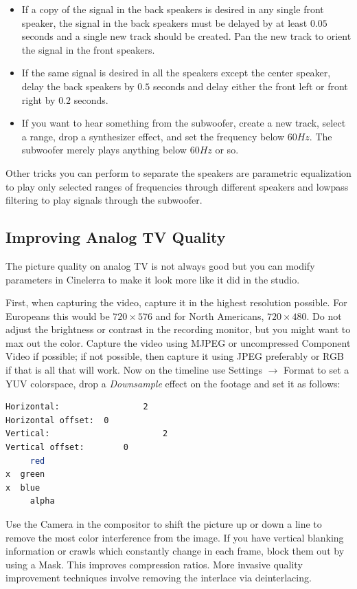 \begin{itemize}
	\item If a copy of the signal in the back speakers is desired in any single front speaker, the signal in the back
	speakers must be delayed by at least $0.05$ seconds and a single new track should be created. Pan the
	new track to orient the signal in the front speakers.
	\item If the same signal is desired in all the speakers except the center speaker, delay the back speakers by
	$0.5$ seconds and delay either the front left or front right by $0.2$ seconds.
	\item If you want to hear something from the subwoofer, create a new track, select a range, drop a
	synthesizer effect, and set the frequency below $60 Hz$. The subwoofer merely plays anything below
	$60Hz$ or so.
\end{itemize}

Other tricks you can perform to separate the speakers are parametric equalization to play only selected ranges of frequencies through different speakers and lowpass filtering to play signals through the subwoofer.

\subsection{Improving Analog TV Quality}%
\label{sub:improving_tv_quality}

The picture quality on analog TV is not always good but you can modify parameters in Cinelerra to make it look more like it did in the studio.

First, when capturing the video, capture it in the highest resolution possible. For Europeans this would be $720\times576$ and for North Americans, $720\times480$. Do not adjust the brightness or contrast in the recording monitor, but you might want to max out the color. Capture the video using MJPEG or uncompressed Component Video if possible; if not possible, then capture it using JPEG preferably or RGB if that is all that will work.  Now on the timeline use Settings $\rightarrow$ Format to set a YUV colorspace, drop a \textit{Downsample} effect on the footage and set it as follows:

\begin{lstlisting}[language=bash,numbers=none]
Horizontal:					2
Horizontal offset: 	0
Vertical:						2
Vertical offset: 		0
	 red
x  green
x  blue
	 alpha
\end{lstlisting}

Use the Camera in the compositor to shift the picture up or down a line to remove the most color interference from the image. If you have vertical blanking information or crawls which constantly change in each frame, block them out by using a Mask. This improves compression ratios.   More invasive quality improvement techniques involve removing the interlace via deinterlacing.

